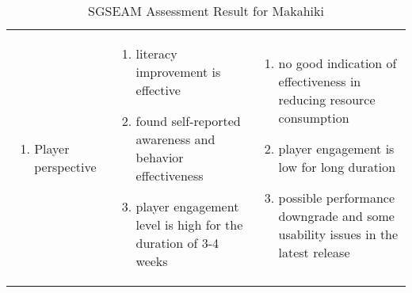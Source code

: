\begin{table}[ht!]
  \centering
  \begin{tabular}{|P{0.17\columnwidth}|P{0.36\columnwidth}|P{0.36\columnwidth}|}
    \hline
     &
     &
     \\
    \hline
    \begin{enumerate}[label={}, nosep, leftmargin=*]
    \item Player perspective 
    \end{enumerate}
    & 
    \setlength{\topmargin}{0pt}
    \begin{enumerate}[nosep, leftmargin=*]
    \item literacy improvement is effective 
    \item found self-reported awareness and behavior effectiveness 
    \item player engagement level is high for the duration of 3-4 weeks
    \end{enumerate}               
    &  
    \begin{enumerate}[nosep, leftmargin=*]
     \item no good indication of effectiveness in reducing resource consumption
     \item player engagement is low for long duration 
     \item possible performance downgrade and some usability issues in the latest release
     \end{enumerate}  \\
    \hline
  \end{tabular}
  \caption{SGSEAM Assessment Result for Makahiki}
  \label{table:assessment-result}
\end{table}

\clearpage    

